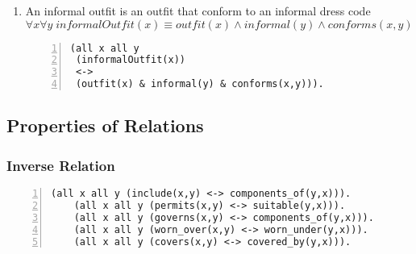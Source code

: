 \documentclass[paper=a4, fontsize=11pt]{scrartcl} %
\numberwithin{equation}{section} %
\numberwithin{figure}{section} %
\numberwithin{table}{section} %
\begin{document}
\begin{enumerate}

	\item An informal outfit is an outfit that conform to an informal dress code
	\begin{equation*}
		\forall x \forall y \; informalOutfit(x) \equiv outfit(x) \land informal(y) \land conforms(x,y)
	\end{equation*}
	\begin{Verbatim}[frame=lines,gobble=2,numbers=left]
 (all x all y 
 (informalOutfit(x))
 <->
 (outfit(x) & informal(y) & conforms(x,y))).
	\end{Verbatim}	


\end{enumerate}
\clearpage

\subsection{Properties of Relations}
\subsubsection{Inverse Relation}
	\begin{Verbatim}[frame=lines,gobble=2,numbers=left]
	(all x all y (include(x,y) <-> components_of(y,x))).
	(all x all y (permits(x,y) <-> suitable(y,x))).
	(all x all y (governs(x,y) <-> components_of(y,x))).
	(all x all y (worn_over(x,y) <-> worn_under(y,x))).
	(all x all y (covers(x,y) <-> covered_by(y,x))).
	\end{Verbatim}	
\end{document}
